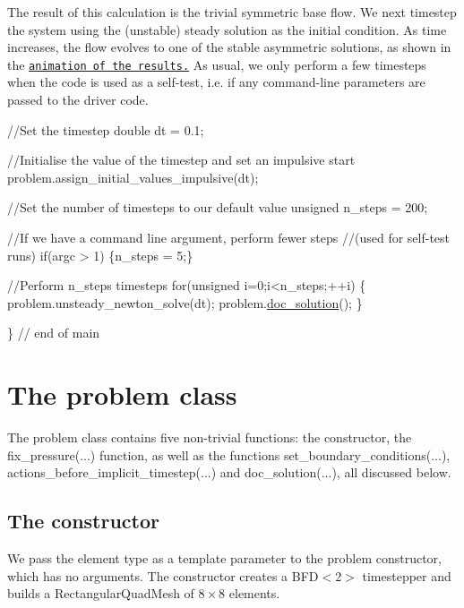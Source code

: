 The result of this calculation is the trivial symmetric base flow. We next timestep the system using the (unstable) steady solution as the initial condition. As time increases, the flow evolves to one of the stable asymmetric solutions, as shown in the \href{../figures/convect.avi}{\tt animation of the results.} As usual, we only perform a few timesteps when the code is used as a self-\/test, i.\+e. if any command-\/line parameters are passed to the driver code.


\begin{DoxyCodeInclude}
 \textcolor{comment}{//Set the timestep}
 \textcolor{keywordtype}{double} dt = 0.1;

 \textcolor{comment}{//Initialise the value of the timestep and set an impulsive start}
 problem.assign\_initial\_values\_impulsive(dt);

 \textcolor{comment}{//Set the number of timesteps to our default value}
 \textcolor{keywordtype}{unsigned} n\_steps = 200;

 \textcolor{comment}{//If we have a command line argument, perform fewer steps }
 \textcolor{comment}{//(used for self-test runs)}
 \textcolor{keywordflow}{if}(argc > 1) \{n\_steps = 5;\}

 \textcolor{comment}{//Perform n\_steps timesteps}
 \textcolor{keywordflow}{for}(\textcolor{keywordtype}{unsigned} i=0;i<n\_steps;++i)
  \{
   problem.unsteady\_newton\_solve(dt);
   problem.\hyperlink{classConvectionProblem_ab7d9e5ac641ca08dd8b04c5eec179593}{doc\_solution}();
  \}

\} \textcolor{comment}{// end of main}

\end{DoxyCodeInclude}




 

\hypertarget{index_problem}{}\section{The problem class}\label{index_problem}
The problem class contains five non-\/trivial functions\+: the constructor, the {\ttfamily fix\+\_\+pressure}(...) function, as well as the functions {\ttfamily set\+\_\+boundary\+\_\+conditions}(...), {\ttfamily actions\+\_\+before\+\_\+implicit\+\_\+timestep}(...) and {\ttfamily doc\+\_\+solution}(...), all discussed below.



 

\hypertarget{index_const}{}\subsection{The constructor}\label{index_const}
We pass the element type as a template parameter to the problem constructor, which has no arguments. The constructor creates a {\ttfamily B\+F\+D$<$2$>$} timestepper and builds a {\ttfamily Rectangular\+Quad\+Mesh} of $ 8\times 8 $ elements.

